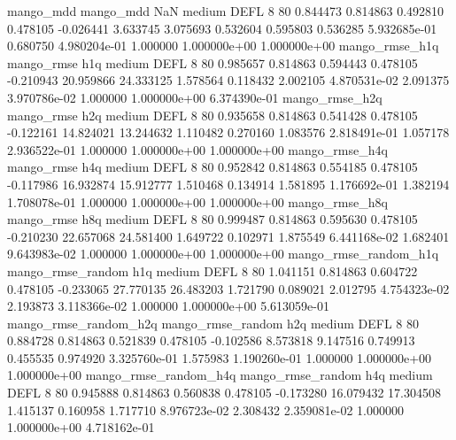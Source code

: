             mango_mdd         mango_mdd                  NaN     medium     DEFL                 8 80  0.844473       0.814863 0.492810       0.478105   -0.026441      3.633745      3.075693     0.532604       0.595803  0.536285 5.932685e-01     0.680750   4.980204e-01            1.000000    1.000000e+00        1.000000e+00
       mango_rmse_h1q        mango_rmse                  h1q     medium     DEFL                 8 80  0.985657       0.814863 0.594443       0.478105   -0.210943     20.959866     24.333125     1.578564       0.118432  2.002105 4.870531e-02     2.091375   3.970786e-02            1.000000    1.000000e+00        6.374390e-01
       mango_rmse_h2q        mango_rmse                  h2q     medium     DEFL                 8 80  0.935658       0.814863 0.541428       0.478105   -0.122161     14.824021     13.244632     1.110482       0.270160  1.083576 2.818491e-01     1.057178   2.936522e-01            1.000000    1.000000e+00        1.000000e+00
       mango_rmse_h4q        mango_rmse                  h4q     medium     DEFL                 8 80  0.952842       0.814863 0.554185       0.478105   -0.117986     16.932874     15.912777     1.510468       0.134914  1.581895 1.176692e-01     1.382194   1.708078e-01            1.000000    1.000000e+00        1.000000e+00
       mango_rmse_h8q        mango_rmse                  h8q     medium     DEFL                 8 80  0.999487       0.814863 0.595630       0.478105   -0.210230     22.657068     24.581400     1.649722       0.102971  1.875549 6.441168e-02     1.682401   9.643983e-02            1.000000    1.000000e+00        1.000000e+00
mango_rmse_random_h1q mango_rmse_random                  h1q     medium     DEFL                 8 80  1.041151       0.814863 0.604722       0.478105   -0.233065     27.770135     26.483203     1.721790       0.089021  2.012795 4.754323e-02     2.193873   3.118366e-02            1.000000    1.000000e+00        5.613059e-01
mango_rmse_random_h2q mango_rmse_random                  h2q     medium     DEFL                 8 80  0.884728       0.814863 0.521839       0.478105   -0.102586      8.573818      9.147516     0.749913       0.455535  0.974920 3.325760e-01     1.575983   1.190260e-01            1.000000    1.000000e+00        1.000000e+00
mango_rmse_random_h4q mango_rmse_random                  h4q     medium     DEFL                 8 80  0.945888       0.814863 0.560838       0.478105   -0.173280     16.079432     17.304508     1.415137       0.160958  1.717710 8.976723e-02     2.308432   2.359081e-02            1.000000    1.000000e+00        4.718162e-01
